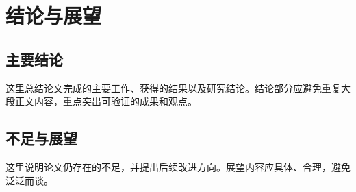 \chapter{结论与展望}

\section{主要结论}

这里总结论文完成的主要工作、获得的结果以及研究结论。结论部分应避免重复大段正文内容，重点突出可验证的成果和观点。

\section{不足与展望}

这里说明论文仍存在的不足，并提出后续改进方向。展望内容应具体、合理，避免泛泛而谈。
